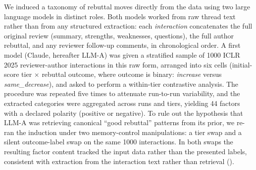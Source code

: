 \documentclass{article}
\begin{document}
We induced a taxonomy of rebuttal moves directly from the data using two large language models in distinct roles. Both models worked from raw thread text rather than from any structured extraction: each \emph{interaction} concatenates the full original review (summary, strengths, weaknesses, questions), the full author rebuttal, and any reviewer follow-up comments, in chronological order. A first model (Claude, hereafter LLM-A) was given a stratified sample of \num{1000} ICLR 2025 reviewer-author interactions in this raw form, arranged into six cells (initial-score tier $\times$ rebuttal outcome, where outcome is binary: \emph{increase} versus \emph{same\_decrease}), and asked to perform a within-tier contrastive analysis. The procedure was repeated five times to attenuate run-to-run variability, and the extracted categories were aggregated across runs and tiers, yielding 44 factors with a declared polarity (positive or negative). To rule out the hypothesis that LLM-A was retrieving canonical ``good rebuttal'' patterns from its prior, we re-ran the induction under two memory-control manipulations: a tier swap and a silent outcome-label swap on the same \num{1000} interactions. In both swaps the resulting factor content tracked the input data rather than the presented labels, consistent with extraction from the interaction text rather than retrieval ().
\end{document}
